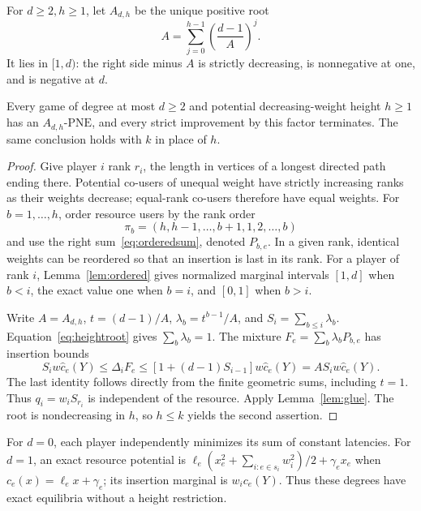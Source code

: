\documentclass[manuscript,review,anonymous]{acmart}
\newcommand{\PNE}{\mathrm{PNE}}
\begin{document}
For $d\ge2,h\ge1$, let $A_{d,h}$ be the unique positive root
\begin{equation}\label{eq:heightroot}
 A=\sum_{j=0}^{h-1}\left(\frac{d-1}{A}\right)^j.
\end{equation}
It lies in $[1,d)$: the right side minus $A$ is strictly decreasing, is nonnegative at one, and is negative at $d$.
\begin{theorem}\label{thm:height}
Every game of degree at most $d\ge2$ and potential decreasing-weight height $h\ge1$ has an $A_{d,h}$-$\PNE$, and every strict improvement by this factor terminates. The same conclusion holds with $k$ in place of $h$.
\end{theorem}
\begin{proof}
Give player $i$ rank $r_i$, the length in vertices of a longest directed path ending there. Potential co-users of unequal weight have strictly increasing ranks as their weights decrease; equal-rank co-users therefore have equal weights. For $b=1,\ldots,h$, order resource users by the rank order
\[
 \pi_b=(h,h-1,\ldots,b+1,1,2,\ldots,b)
\]
and use the right sum~\eqref{eq:orderedsum}, denoted $P_{b,e}$. In a given rank, identical weights can be reordered so that an insertion is last in its rank. For a player of rank $i$, Lemma~\ref{lem:ordered} gives normalized marginal intervals $[1,d]$ when $b<i$, the exact value one when $b=i$, and $[0,1]$ when $b>i$.

Write $A=A_{d,h}$, $t=(d-1)/A$, $\lambda_b=t^{b-1}/A$, and $S_i=\sum_{b\le i}\lambda_b$. Equation~\eqref{eq:heightroot} gives $\sum_b\lambda_b=1$. The mixture $F_e=\sum_b\lambda_bP_{b,e}$ has insertion bounds
\[
 S_iw\widehat c_e(Y)\le\Delta_iF_e
 \le[1+(d-1)S_{i-1}]w\widehat c_e(Y)
 =AS_iw\widehat c_e(Y).
\]
The last identity follows directly from the finite geometric sums, including $t=1$. Thus $q_i=w_iS_{r_i}$ is independent of the resource. Apply Lemma~\ref{lem:glue}. The root is nondecreasing in $h$, so $h\le k$ yields the second assertion.
\end{proof}
For $d=0$, each player independently minimizes its sum of constant latencies. For $d=1$, an exact resource potential is $\ell_e(x_e^2+\sum_{i:e\in s_i}w_i^2)/2+\gamma_ex_e$ when $c_e(x)=\ell_ex+\gamma_e$; its insertion marginal is $w_ic_e(Y)$. Thus these degrees have exact equilibria without a height restriction.
\end{document}
